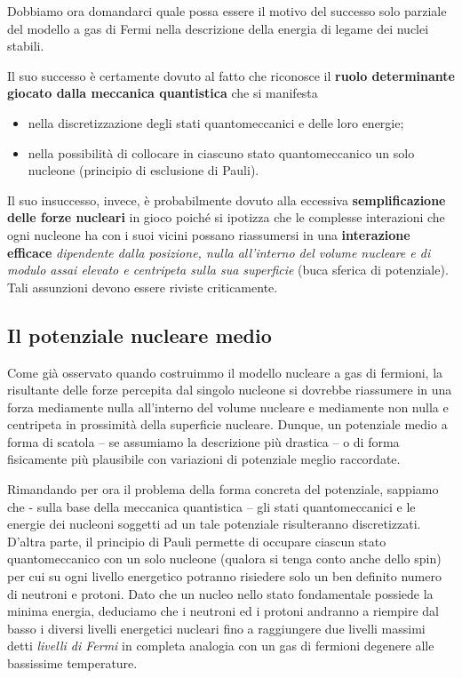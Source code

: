 Dobbiamo ora domandarci quale possa essere il motivo del successo solo parziale del modello a gas di Fermi nella descrizione della energia di legame dei nuclei stabili.

Il suo successo è certamente dovuto al fatto che riconosce il \textbf{ruolo determinante giocato dalla meccanica quantistica} che si manifesta
\begin{itemize}
	\item nella discretizzazione degli stati quantomeccanici e delle loro energie;
	\item nella possibilità di collocare in ciascuno stato quantomeccanico un solo nucleone (principio di esclusione di Pauli).
\end{itemize}

Il suo insuccesso, invece, è probabilmente dovuto alla eccessiva \textbf{semplificazione delle forze nucleari} in gioco poiché si ipotizza che le complesse interazioni che ogni nucleone ha con i suoi vicini possano riassumersi in una \textbf{interazione efficace} \emph{dipendente dalla posizione, nulla all’interno del volume nucleare e di modulo assai elevato e centripeta sulla sua superficie} (buca sferica di potenziale). Tali assunzioni devono essere riviste criticamente.

\subsection{Il potenziale nucleare medio}\label{sec:potenziale-nucleare-medio}

Come già osservato quando costruimmo il modello nucleare a gas di fermioni, la risultante delle forze percepita dal singolo nucleone si dovrebbe riassumere in una forza mediamente nulla all’interno del volume nucleare e mediamente non nulla e centripeta in prossimità della superficie nucleare.
Dunque, un potenziale medio a forma di scatola – se assumiamo la descrizione più drastica – o di forma fisicamente più plausibile con variazioni di potenziale meglio raccordate.

Rimandando per ora il problema della forma concreta del potenziale, sappiamo che - sulla base della meccanica quantistica – gli stati quantomeccanici e le energie dei nucleoni soggetti ad un tale potenziale risulteranno discretizzati.
D’altra parte, il principio di Pauli permette di occupare ciascun stato quantomeccanico con un solo nucleone (qualora si tenga conto anche dello spin) per cui su ogni livello energetico potranno risiedere solo un ben definito numero di neutroni e protoni.
Dato che un nucleo nello stato fondamentale possiede la minima energia, deduciamo che i neutroni ed i protoni andranno a riempire dal basso i diversi livelli energetici nucleari fino a raggiungere due livelli massimi detti \emph{livelli di Fermi} in completa analogia con un gas di fermioni degenere alle bassissime temperature.

